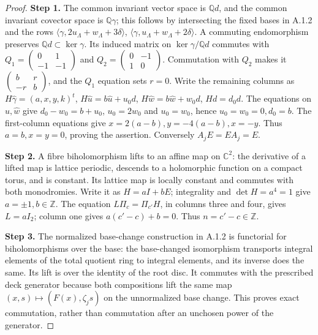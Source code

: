 \begin{proof}
\par\smallskip\noindent\textbf{Step 1.} The common invariant vector space is $\mathbb Qd$, and the common invariant covector space is $\mathbb Q\gamma$; this follows by intersecting the fixed bases in A.1.2 and the rows $\langle\gamma,2u_{\Lambda}+w_{\Lambda}+3\delta\rangle$, $\langle\gamma,u_{\Lambda}+w_{\Lambda}+2\delta\rangle$. A commuting endomorphism preserves $\mathbb Qd\subset\ker\gamma$. Its induced matrix on $\ker\gamma/\mathbb Qd$ commutes with
$Q_1=\left(\begin{smallmatrix}0&1\\-1&-1\end{smallmatrix}\right)$ and $Q_2=\left(\begin{smallmatrix}0&-1\\1&0\end{smallmatrix}\right)$. Commutation with $Q_2$ makes it $\left(\begin{smallmatrix}b&r\\-r&b\end{smallmatrix}\right)$, and the $Q_1$ equation sets $r=0$. Write the remaining columns as
$H\widehat\gamma=(a,x,y,k)^t$, $H\widehat u=b\widehat u+u_0d$, $H\widehat w=b\widehat w+w_0d$, $Hd=d_0d$. The equations on $\widehat u,\widehat w$ give $d_0-w_0=b+u_0$, $u_0=2w_0$ and $u_0=w_0$, hence $u_0=w_0=0,d_0=b$. The first-column equations give $x=2(a-b),y=-4(a-b),x=-y$. Thus $a=b,x=y=0$, proving the assertion. Conversely $A_jE=EA_j=E$.

\par\smallskip\noindent\textbf{Step 2.} A fibre biholomorphism lifts to an affine map on $\mathbb C^2$: the derivative of a lifted map is lattice periodic, descends to a holomorphic function on a compact torus, and is constant. Its lattice map is locally constant and commutes with both monodromies. Write it as $H=aI+bE$; integrality and $\det H=a^4=1$ give $a=\pm1,b\in\mathbb Z$. The equation $L\Pi_c=\Pi_{c'}H$, in columns three and four, gives $L=aI_2$; column one gives $a(c'-c)+b=0$. Thus $n=c'-c\in\mathbb Z$.

\par\smallskip\noindent\textbf{Step 3.} The normalized base-change construction in A.1.2 is functorial for biholomorphisms over the base: the base-changed isomorphism transports integral elements of the total quotient ring to integral elements, and its inverse does the same. Its lift is over the identity of the root disc. It commutes with the prescribed deck generator because both compositions lift the same map $(x,s)\mapsto(F(x),\zeta_js)$ on the unnormalized base change. This proves exact commutation, rather than commutation after an unchosen power of the generator.


\end{proof}
